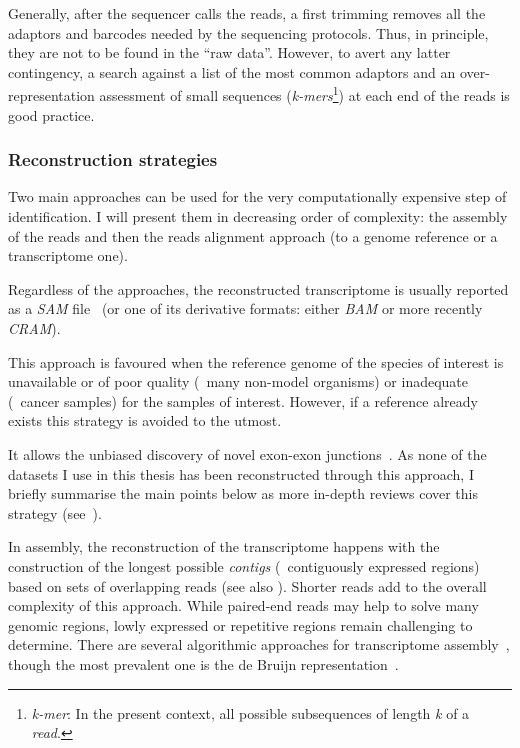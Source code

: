 Generally, after the sequencer calls the reads, a first trimming removes
all the adaptors and barcodes needed by the sequencing protocols. Thus,
in principle, they are not to be found in the \enquote{raw data}.
However, to avert any latter contingency, a search against
a list of the most common adaptors and an over-representation assessment of small
sequences (\emph{k-mers}\footnote{\emph{k-mer}: In the present context, all
possible subsequences of length
\emph{k} of a \emph{read}.}) at each end of the reads is good practice.


\subsubsection{Reconstruction strategies}\label{subsec:reconstruction}

Two main approaches can be used for the very computationally expensive step of
identification. I will present them in decreasing order of complexity:
the  assembly of the reads and then the reads alignment approach
(to a genome reference or a transcriptome one).

Regardless of the approaches, the reconstructed transcriptome is usually reported
as a \emph{\gls{SAM}} file~ (or one of its derivative formats:
either \emph{\gls{BAM}} or more recently \emph{CRAM}).


This approach is favoured when the reference genome of the species of interest
is unavailable or of poor quality
(\eg\ many non-model organisms) or inadequate (\eg\ cancer samples)
for the samples of interest. However, if a reference already exists this strategy
is avoided to the utmost.

It allows the unbiased discovery of novel
exon-exon junctions~. As none of the datasets I use in this
thesis has been reconstructed through this approach, I briefly summarise
the main points below as more in-depth reviews cover this strategy
(see~\cite{denovoReview}).

In  assembly, the reconstruction of the transcriptome happens
with the construction of the longest possible \emph{contigs} (\ie\ contiguously
expressed regions) based on sets of overlapping reads (see also
). Shorter reads add
to the overall complexity of this approach. While paired-end reads may help to
solve many genomic regions, lowly expressed or repetitive regions remain
challenging to determine. There are several algorithmic approaches for  transcriptome assembly~,
though the most prevalent one is the de Bruijn representation~.

